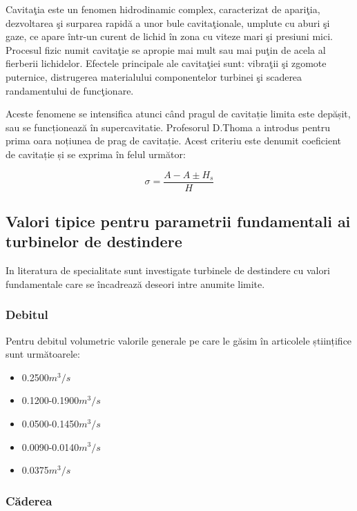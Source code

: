 Cavita\c{t}ia este un fenomen hidrodinamic complex, caracterizat de apari\c{t}ia, dezvoltarea \c{s}i surparea rapid\u{a} a unor bule cavita\c{t}ionale, umplute cu aburi \c{s}i gaze, ce apare \^{i}ntr-un curent de lichid \^{i}n zona cu viteze mari \c{s}i presiuni mici. Procesul fizic numit cavita\c{t}ie se apropie mai mult sau mai pu\c{t}in de acela al fierberii lichidelor. Efectele principale ale cavita\c{t}iei sunt: vibra\c{t}ii \c{s}i zgomote puternice, distrugerea materialului componentelor turbinei \c{s}i scaderea randamentului de func\c{t}ionare.

Aceste fenomene se intensifica atunci când pragul de cavitație limita este depășit, sau se funcționează în supercavitatie. Profesorul D.Thoma a introdus pentru prima oara noțiunea de prag de cavitație. Acest criteriu este denumit coeficient de cavitație și se exprima în felul următor:

\begin{equation}
\sigma=\frac{A-A\pm{H_s}}{H}
\end{equation}


\subsection{Valori tipice pentru parametrii fundamentali ai turbinelor de destindere}

In literatura de specialitate sunt investigate turbinele de destindere cu valori fundamentale care se încadrează deseori intre anumite limite.


\subsubsection{Debitul}
Pentru debitul volumetric valorile generale pe care le găsim în articolele științifice sunt următoarele:

\begin{itemize}
	\item 0.2500$\si{m^3/s}$ \cite{gentner2000experimentelle}
	\item 0.1200-0.1900$\si{m^3/s}$ \cite{GREES_2014}
	\item 0.0500-0.1450$\si{m^3/s}$ \cite{susanhub}
	\item 0.0090-0.0140$\si{m^3/s}$ \cite{biner2016engineering}
	\item 0.0375$\si{m^3/s}$ \cite{hasmatuchi2014new}
\end{itemize}


\subsubsection{C\u{a}derea}

